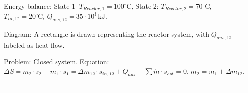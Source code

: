 Energy balance:  
State 1: \( T_{Reactor,1} = 100^\circ \text{C} \),  
State 2: \( T_{Reactor,2} = 70^\circ \text{C} \),  
\( T_{in,12} = 20^\circ \text{C} \),  
\( Q_{aus,12} = 35 \cdot 10^3 \, \text{kJ} \).  

Diagram:  
A rectangle is drawn representing the reactor system, with \( Q_{aus,12} \) labeled as heat flow.  

Problem: Closed system.  
Equation:  
\( \Delta S = m_2 \cdot s_2 - m_1 \cdot s_1 = \Delta m_{12} \cdot s_{in,12} + Q_{aus} - \sum \dot{m} \cdot s_{out} = 0 \).  
\( m_2 = m_1 + \Delta m_{12} \).  

---